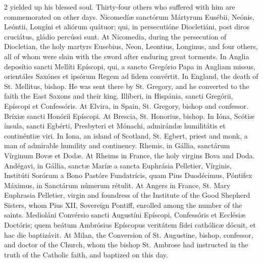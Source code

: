 \begin{paracol}{2}
 yielded up his blessed soul. Thirty-four others who suffered with him 
 are commemorated on other days.
\switchcolumn*
{}
Nicomedíæ sanctórum 
 Mártyrum Eusébii, Neónis, Leóntii, Longíni et aliórum quátuor; qui, in 
 persecutióne Diocletiáni, post diros cruciátus, gládio percússi sunt.
\switchcolumn
{}
At Nicomedia, during the 
 persecution of Diocletian, the holy martyrs Eusebius, Neon, Leontius, 
 Longinus, and four others, all of whom were slain with the sword after 
 enduring great torments.
\switchcolumn*
{}
In Anglia deposítio 
 sancti Mellíti Epíscopi, qui, a sancto Gregório Papa in Angliam missus, 
 orientáles Saxónes et ipsórum Regem ad fidem convértit.
\switchcolumn
{}
In England, the death of St. 
 Mellitus, bishop. He was sent there by St. Gregory, and he converted 
 to the faith the East Saxons and their king.
\switchcolumn*
{}
Illíberi, in Hispánia, sancti Gregórii, Epíscopi et Confessóris.
\switchcolumn
{}
At Elvira, in Spain, St. Gregory, 
 bishop and confessor.
\switchcolumn*
{}
Bríxiæ sancti Honórii 
 Epíscopi.
\switchcolumn
{}
At Brescia, St. Honorius, bishop.
\switchcolumn*
{}
In Ióna, Scótiæ 
 ínsula, 
 sancti Egbérti, Presbyteri et Mónachi, admirándæ humilitátis et continéntiæ 
 viri.
\switchcolumn
{}
In Iona, an island of Scotland, St. 
 Egbert, priest and monk, a man of admirable humility and continency.
\switchcolumn*
{}
Rhemis, in Gállia, 
 sanctárum Vírginum Bovæ et Dodæ.
\switchcolumn
{}
At Rheims in France, the holy 
 virgins Bova and Doda.
\switchcolumn*
{}
Andégavi, in Gállia, 
 sanctæ Maríæ a sancta Euphrásia Pelletier, Vírginis, Institúti Sorórum a 
 Bono Pastóre Fundatrícis, quam Pius Duodécimus, Póntifex Máximus, in 
 Sanctárum númerum rétulit.
\switchcolumn
{}
At Angers in France, St. Mary Euphrasia Pelletier, virgin and foundress of the Institute of the Good 
 Shepherd Sisters, whom Pius XII, Sovereign Pontiff, enrolled among the 
 number of the saints.
\switchcolumn*
{}
Medioláni Convérsio 
 sancti Augustíni Epíscopi, Confessóris et Ecclésiæ Doctóris; quem beátum 
 Ambrósius Epíscopus veritátem fídei cathólicæ dócuit, et hac die baptizávit.
\switchcolumn
{}
At Milan, the Conversion of St. 
 Augustine, bishop, confessor, and doctor of the Church, whom the bishop St. 
 Ambrose had instructed in the truth of the Catholic faith, and baptized on 
 this day.
\switchcolumn*
{}
\end{paracol}



